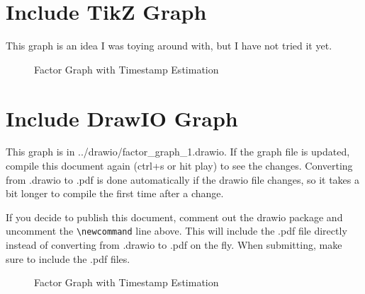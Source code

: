 \documentclass{article}
\begin{document}
\section{Include TikZ Graph}

This graph is an idea I was toying around with, but I have not tried it yet.

\begin{figure}[ht]
\centering

\caption{Factor Graph with Timestamp Estimation}
\label{fig:factor_graph}
\end{figure}


\section{Include DrawIO Graph}

This graph is in ../drawio/factor_graph_1.drawio. If the graph file is updated, compile this document again (ctrl+s or hit play) to see the changes. Converting from .drawio to .pdf is done automatically if the drawio file changes, so it takes a bit longer to compile the first time after a change.

If you decide to publish this document, comment out the drawio package and uncomment the \verb|\newcommand| line above. This will include the .pdf file directly instead of converting from .drawio to .pdf on the fly. When submitting, make sure to include the .pdf files.

\begin{figure}[ht]
\centering
{}
\caption{Factor Graph with Timestamp Estimation}
\label{fig:factor_graph_1}
\end{figure}
\end{document}
